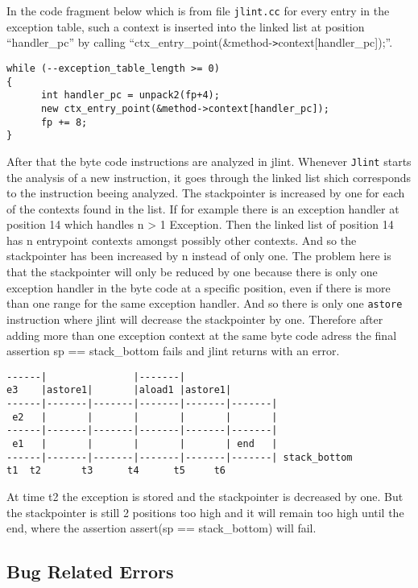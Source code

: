 \documentclass[11pt,twoside,a4paper,draft]{article}
\begin{document}
In the code fragment below which is from file \texttt{jlint.cc} for 
every entry in the exception table, such a context is inserted into the linked
list at position ``handler\_pc'' by calling ``ctx\_entry\_point(\&method-\verb+>+context[handler\_pc]);''.
\begin{verbatim}
while (--exception_table_length >= 0)
{ 
      int handler_pc = unpack2(fp+4);
      new ctx_entry_point(&method->context[handler_pc]); 
      fp += 8;
}
\end{verbatim}
After that the byte code instructions are analyzed in jlint. Whenever 
\texttt{Jlint} starts the analysis of a new instruction, it goes through the
linked list shich corresponds to the instruction beeing analyzed. The 
stackpointer is increased by one for each of the contexts found in the list.
If for example there is an exception handler at position 14 which handles
n > 1 Exception. Then the linked list of position 14 has n entrypoint
contexts amongst possibly other contexts. And so the stackpointer has been
increased by n instead of only one. The problem here is that the stackpointer
will only be reduced by one because there is only one exception 
handler in the byte code at a specific position, even if there is more than 
one range for the same exception handler. And so there is only one 
\texttt{astore} instruction
where jlint will decrease the stackpointer by one. Therefore after adding more
than one exception context at the same byte code adress the final assertion
sp == stack\_bottom fails and jlint returns with an error.

\begin{verbatim}
------|               |-------|
e3    |astore1|       |aload1 |astore1|
------|-------|-------|-------|-------|-------|
 e2   |       |       |       |       |       |
------|-------|-------|-------|-------|-------|
 e1   |       |       |       |       | end   |
------|-------|-------|-------|-------|-------| stack_bottom
t1	t2       t3      t4      t5     t6
\end{verbatim}


At time t2 the exception is stored and the stackpointer is decreased by one.
But the stackpointer is still 2 positions too high and it will remain too high
until the end, where the assertion assert(sp == stack\_bottom) will fail.

\subsection {Bug Related Errors}
\end{document}

